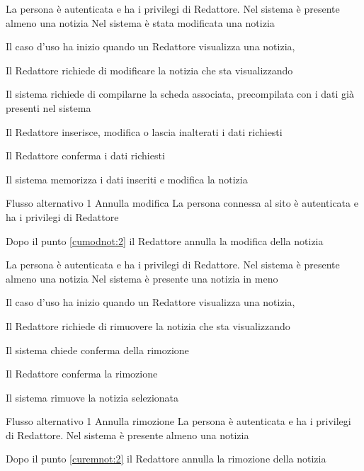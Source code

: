 {}
{La persona è autenticata e ha i privilegi di Redattore. Nel sistema è presente almeno una notizia}
{Nel sistema è stata modificata una notizia}
{\begin{enumCU}
	\item Il caso d'uso ha inizio quando un Redattore visualizza una notizia, 
	\item Il Redattore richiede di modificare la notizia che sta visualizzando
	\item Il sistema richiede di compilarne la scheda associata, precompilata con i dati già presenti nel sistema 
	\item Il Redattore inserisce, modifica o lascia inalterati i dati richiesti \label{cumodnot:2}
	\item Il Redattore conferma i dati richiesti
	\item Il sistema memorizza i dati inseriti e modifica la notizia
\end{enumCU}}
%
{Flusso alternativo 1}%
{Annulla modifica}%
{La persona connessa al sito è autenticata e ha i privilegi di Redattore}%
{\postNulle}%
{\begin{enumCU}
		\item Dopo il punto \ref{cumodnot:2} il Redattore annulla la modifica della notizia
\end{enumCU}}%


{}
{La persona è autenticata e ha i privilegi di Redattore. Nel sistema è presente almeno una notizia}
{Nel sistema è presente una notizia in meno}
{\begin{enumCU}
	\item Il caso d'uso ha inizio quando un Redattore visualizza una notizia, 
	\item Il Redattore richiede di rimuovere la notizia che sta visualizzando
	\item Il sistema chiede conferma della rimozione \label{curemnot:2}
	\item Il Redattore conferma la rimozione
	\item Il sistema rimuove la notizia selezionata
\end{enumCU}}
%
{Flusso alternativo 1}%
{Annulla rimozione}%
{La persona è autenticata e ha i privilegi di Redattore. Nel sistema è presente almeno una notizia}%
{\postNulle}%
{\begin{enumCU}
		\item Dopo il punto \ref{curemnot:2} il Redattore annulla la rimozione della notizia
	\end{enumCU}}%

